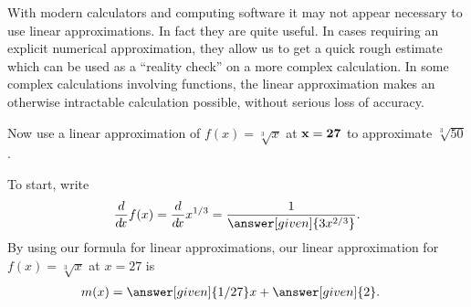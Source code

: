 \documentclass[handout,nooutcomes]{ximera}
\begin{document}
With modern calculators and computing software it may not appear
necessary to use linear approximations. In fact they are quite
useful. In cases requiring an explicit numerical approximation, they
allow us to get a quick rough estimate which can be used as a
``reality check'' on a more complex calculation. In some complex
calculations involving functions, the linear approximation makes an
otherwise intractable calculation possible, without serious loss of
accuracy.




\begin{example}
Now use a linear approximation of $f(x) =\sqrt[3]{x}$ at ${\bf x=27}$ to
approximate $\sqrt[3]{50}$.
\begin{explanation}
To start, write
\[
\ddx f(x) = \ddx x^{1/3} = \frac{1}{\answer[given]{3x^{2/3}}}.
\]
By using our formula for linear approximations, our linear 
approximation for $f(x)=\sqrt[3]{x}$ at $x=27$ is
\begin{align*}
m(x) &= \answer[given]{1/27}x + \answer[given]{2}.
\end{align*}



\begin{image}
\end{image}


\end{explanation}
\end{example}
\end{document}
